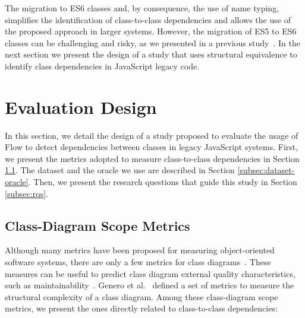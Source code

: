 \documentclass[review]{elsarticle}
\begin{document}
The migration to ES6 classes and, by consequence, the use of name typing, simplifies the identification of class-to-class dependencies and allows the use of the proposed approach in larger systems. However, the migration of ES5 to ES6 classes can be challenging and risky, as we presented in a previous study~\cite{icsr2017}. In the next section we present the design of a study that uses structural equivalence to identify class dependencies in JavaScript legacy code.


\section{Evaluation Design}
\label{sec:study-design}

In this section, we detail the design of a study proposed to evaluate the usage of Flow to detect dependencies between classes in legacy JavaScript systems. First, we present the metrics adopted to measure class-to-class dependencies in Section \ref{subsec:metrics}. The dataset and the oracle we use are described in Section \ref{subsec:dataset-oracle}. Then, we present the research questions that guide this study in Section \ref{subsec:rqs}.

\subsection{Class-Diagram Scope Metrics}
\label{subsec:metrics}

Although many metrics have been proposed for measuring object-oriented software systems, there are only a
few metrics for class diagrams~\cite{yi2004,genero2005}. These measures can be useful to predict class diagram external quality characteristics, such as maintainability~\cite{genero2002a, genero2005}. Genero et al.~\cite{genero2001, genero-phd-2002} defined a set of metrics to measure the structural complexity of a class diagram. Among these class-diagram scope metrics, we present the ones directly related to class-to-class dependencies:
\end{document}
